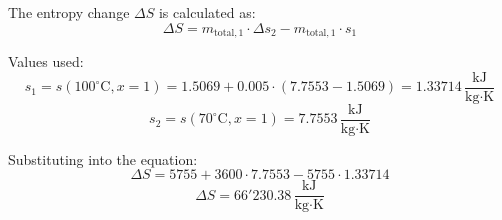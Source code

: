 The entropy change \( \Delta S \) is calculated as:  
\[
\Delta S = m_{\text{total},1} \cdot \Delta s_2 - m_{\text{total},1} \cdot s_1
\]  

Values used:  
\[
s_1 = s(100^\circ\text{C}, x=1) = 1.5069 + 0.005 \cdot (7.7553 - 1.5069) = 1.33714 \, \frac{\text{kJ}}{\text{kg·K}}
\]  
\[
s_2 = s(70^\circ\text{C}, x=1) = 7.7553 \, \frac{\text{kJ}}{\text{kg·K}}
\]  

Substituting into the equation:  
\[
\Delta S = 5755 + 3600 \cdot 7.7553 - 5755 \cdot 1.33714
\]  
\[
\Delta S = 66'230.38 \, \frac{\text{kJ}}{\text{kg·K}}
\]